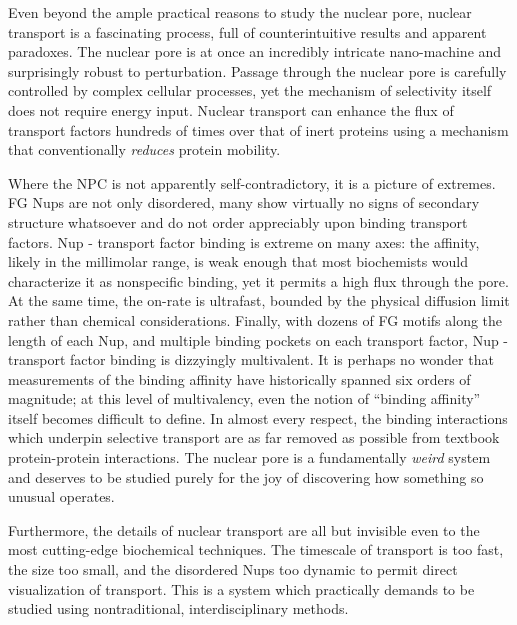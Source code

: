 Even beyond the ample practical reasons to study the nuclear pore, nuclear transport is a fascinating process, full of counterintuitive results and apparent paradoxes.  The nuclear pore is at once an incredibly intricate nano-machine and surprisingly robust to perturbation.  Passage through the nuclear pore is carefully controlled by complex cellular processes, yet the mechanism of selectivity itself does not require energy input.  Nuclear transport can enhance the flux of transport factors hundreds of times over that of inert proteins using a mechanism that conventionally \textit{reduces} protein mobility.

Where the NPC is not apparently self-contradictory, it is a picture of extremes.  FG Nups are not only disordered, many show virtually no signs of secondary structure whatsoever and do not order appreciably upon binding transport factors.  Nup - transport factor binding is extreme on many axes: the affinity, likely in the millimolar range, is weak enough that most biochemists would characterize it as nonspecific binding, yet it permits a high flux through the pore.  At the same time, the on-rate is ultrafast, bounded by the physical diffusion limit rather than chemical considerations.  Finally, with dozens of FG motifs along the length of each Nup, and multiple binding pockets on each transport factor, Nup - transport factor binding is dizzyingly multivalent.  It is perhaps no wonder that measurements of the binding affinity have historically spanned six orders of magnitude; at this level of multivalency, even the notion of ``binding affinity'' itself becomes difficult to define.  In almost every respect, the binding interactions which underpin selective transport are as far removed as possible from textbook protein-protein interactions.  The nuclear pore is a fundamentally \textit{weird} system and deserves to be studied purely for the joy of discovering how something so unusual operates.

Furthermore, the details of nuclear transport are all but invisible even to the most cutting-edge biochemical techniques.  The timescale of transport is too fast, the size too small, and the disordered Nups too dynamic to permit direct visualization of transport.  This is a system which practically demands to be studied using nontraditional, interdisciplinary methods. 

